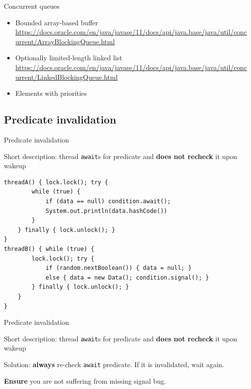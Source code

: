 \begin{frame}[t,fragile]{Concurrent queues}

\begin{itemize}
    \item Bounded array-based buffer {\tiny\url{https://docs.oracle.com/en/java/javase/11/docs/api/java.base/java/util/concurrent/ArrayBlockingQueue.html}}

    \item Optionally limited-length linked list {\tiny\url{https://docs.oracle.com/en/java/javase/11/docs/api/java.base/java/util/concurrent/LinkedBlockingQueue.html}}

    \item Elements with priorities 
\end{itemize}
\end{frame}

\subsection{Predicate invalidation}
\showTOCSub

\begin{frame}[t,fragile]{Predicate invalidation}

Short description: thread \texttt{await}s for predicate and \textbf{does not recheck} it upon wakeup

\begin{verbatim}
threadA() { lock.lock(); try {
        while (true) {
            if (data == null) condition.await();
            System.out.println(data.hashCode())            
        }
    } finally { lock.unlock(); } 
}
threadB() { while (true) {
        lock.lock(); try {
            if (random.nextBoolean()) { data = null; } 
            else { data = new Data(); condition.signal(); }
        } finally { lock.unlock(); }
    }
}
\end{verbatim}
\end{frame}

\begin{frame}{Predicate invalidation}

Short description: thread \texttt{await}s for predicate and \textbf{does not recheck} it upon wakeup

Solution: \textbf{always} re-check \texttt{await} predicate. If it is invalidated, wait again. 

\textbf{Ensure} you are not suffering from missing signal bug.
\end{frame}

